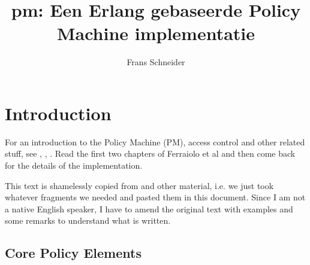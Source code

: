 \documentclass[12pt,a4paper,titlepage]{book}
\author{Frans Schneider}
\title{pm: Een Erlang gebaseerde Policy Machine implementatie}
\begin{document}
	\maketitle
	\tableofcontents
	\listoffigures
	\lstlistoflistings
	
	\lstset{
		language=erlang,
		basicstyle=\small\ttfamily,
		breaklines=true,                 %
		captionpos=b,                    %
		keepspaces=true,                 %
		tabsize=4
	}
	
	\chapter{Introduction}
	
	For an introduction to the Policy Machine (PM), access control and other related stuff, see \cite{NISTIR-7987-REV-1}, \cite{NISTIR-7316}, \cite{Assessment-AC-Systems}. Read the first two chapters of Ferraiolo et al \cite{NISTIR-7987-REV-1} and then come back for the details of the implementation.
	
	This text is shamelessly copied from \cite{NISTIR-7987-REV-1} and other material, i.e. we just took whatever fragments we needed and pasted them in this document. Since I am not a native English speaker, I have to amend the original text with examples and some remarks to understand what is written.
	
	\section{Core Policy Elements}
	
\end{document}
